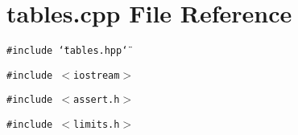 \section{tables.cpp File Reference}
\label{tables_8cpp}
{\tt \#include \char`\"{}tables.hpp\char`\"{}}\par
{\tt \#include $<$iostream$>$}\par
{\tt \#include $<$assert.h$>$}\par
{\tt \#include $<$limits.h$>$}\par
